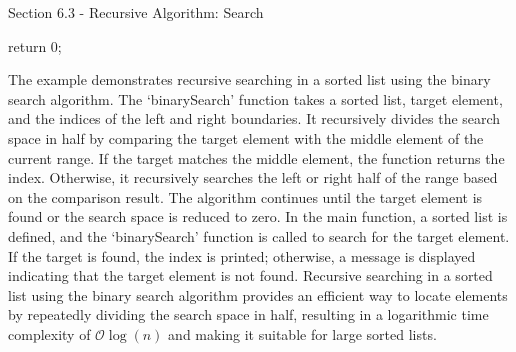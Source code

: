 \begin{notes}{Section 6.3 - Recursive Algorithm: Search}
\begin{highlight}
\begin{code}[C++]
{        return 0;
    }
    \end{code}
        The example demonstrates recursive searching in a sorted list using the binary search algorithm. The `binarySearch' function takes a sorted list, target element, and the indices of the left and right boundaries. It recursively divides the search space in half by comparing the target element with the 
        middle element of the current range. If the target matches the middle element, the function returns the index. Otherwise, it recursively searches the left or right half of the range based on the comparison result. The algorithm continues until the target element is found or the search space is reduced 
        to zero. In the main function, a sorted list is defined, and the `binarySearch' function is called to search for the target element. If the target is found, the index is printed; otherwise, a message is displayed indicating that the target element is not found. Recursive searching in a sorted list using 
        the binary search algorithm provides an efficient way to locate elements by repeatedly dividing the search space in half, resulting in a logarithmic time complexity of $\mathcal{O}\log{(n)}$ and making it suitable for large sorted lists.
    \end{highlight}
\end{notes}

